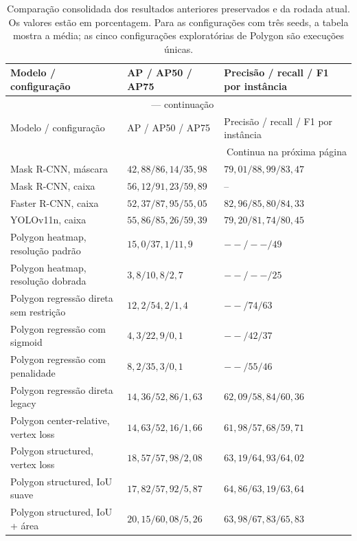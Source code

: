 \documentclass[11pt]{article}
\begin{document}
\small
\setlength{\tabcolsep}{2pt}
\renewcommand{\arraystretch}{1.12}
\begin{longtable}{@{}p{3.5cm}p{6.0cm}p{6.0cm}@{}}
\caption{Comparação consolidada dos resultados anteriores preservados e da rodada
atual. Os valores estão em porcentagem. Para as configurações com três seeds, a
tabela mostra a média; as cinco configurações exploratórias de Polygon são
execuções únicas.}
\label{tab:resumo_comparativo}\\
\toprule
Modelo / configuração & AP / AP50 / AP75 & Precisão / recall / F1 por instância \\
\midrule
\endfirsthead
\multicolumn{3}{c}{\tablename\ \thetable{} --- continuação}\\
\toprule
Modelo / configuração & AP / AP50 / AP75 & Precisão / recall / F1 por instância \\
\midrule
\endhead
\midrule
\multicolumn{3}{r}{Continua na próxima página}\\
\endfoot
\bottomrule
\endlastfoot
Mask R-CNN, máscara & $42,88 / 86,14 / 35,98$ & $79,01 / 88,99 / 83,47$ \\
Mask R-CNN, caixa & $56,12 / 91,23 / 59,89$ & -- \\
Faster R-CNN, caixa & $52,37 / 87,95 / 55,05$ & $82,96 / 85,80 / 84,33$ \\
YOLOv11n, caixa & $55,86 / 85,26 / 59,39$ & $79,20 / 81,74 / 80,45$ \\
Polygon heatmap, resolução padrão & $15,0 / 37,1 / 11,9$ & $-- / -- / 49$ \\
Polygon heatmap, resolução dobrada & $3,8 / 10,8 / 2,7$ & $-- / -- / 25$ \\
Polygon regressão direta sem restrição & $12,2 / 54,2 / 1,4$ & $-- / 74 / 63$ \\
Polygon regressão com sigmoid & $4,3 / 22,9 / 0,1$ & $-- / 42 / 37$ \\
Polygon regressão com penalidade & $8,2 / 35,3 / 0,1$ & $-- / 55 / 46$ \\
Polygon regressão direta legacy & $14,36 / 52,86 / 1,63$ & $62,09 / 58,84 / 60,36$ \\
Polygon center-relative, vertex loss & $14,63 / 52,16 / 1,66$ & $61,98 / 57,68 / 59,71$ \\
Polygon structured, vertex loss & $18,57 / 57,98 / 2,08$ & $63,19 / 64,93 / 64,02$ \\
Polygon structured, IoU suave & $17,82 / 57,92 / 5,87$ & $64,86 / 63,19 / 63,64$ \\
Polygon structured, IoU + área & $20,15 / 60,08 / 5,26$ & $63,98 / 67,83 / 65,83$ \\
\end{longtable}
\end{document}
